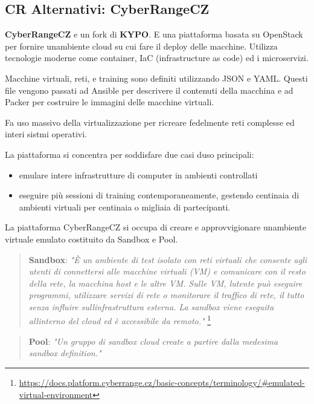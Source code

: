 \subsection{CR Alternativi:
CyberRangeCZ}\label{cr-alternativi-cyberrangecz}

\textbf{CyberRangeCZ} e\textquotesingle{} un fork di \textbf{KYPO}.
E\textquotesingle{} una piattaforma basata su OpenStack per fornire
un\textquotesingle ambiente cloud su cui fare il deploy delle macchine.
Utilizza tecnologie moderne come container, IaC (infrastructure as code)
ed i microservizi.

Macchine virtuali, reti, e training sono definiti utilizzando JSON e
YAML. Questi file vengono passati ad Ansible per descrivere il contenuti
della macchina e ad Packer per costruire le immagini delle macchine
virtuali.

Fa uso massivo della virtualizzazione per ricreare fedelmente reti
complesse ed interi sistmi operativi.

La piattaforma si concentra per soddisfare due casi
d\textquotesingle uso principali:

\begin{itemize}
\tightlist
\item
  emulare intere infrastrutture di computer in ambienti controllati
\item
  eseguire più sessioni di training contemporaneamente, gestendo
  centinaia di ambienti virtuali per centinaia o migliaia di
  partecipanti.
\end{itemize}

La piattaforma CyberRangeCZ si occupa di creare e approvvigionare
un\textquotesingle ambiente virtuale emulato costituito da Sandbox e
Pool.

\begin{quote}
\textbf{Sandbox}: \emph{"È un ambiente di test isolato con reti virtuali
che consente agli utenti di connettersi alle macchine virtuali (VM) e
comunicare con il resto della rete, la macchina host e le altre VM.
Sulle VM, l\textquotesingle utente può eseguire programmi, utilizzare
servizi di rete o monitorare il traffico di rete, il tutto senza
influire sull\textquotesingle infrastruttura esterna. La sandbox viene
eseguita all\textquotesingle interno del cloud ed è accessibile da
remoto."} \footnote{\label{fn:ref_13}\url{https://docs.platform.cyberrange.cz/basic-concepts/terminology/\#emulated-virtual-environment}}
\end{quote}

\begin{quote}
\textbf{Pool}: \emph{"Un gruppo di sandbox cloud create a partire dalla
medesima sandbox definition."} 
\end{quote}

